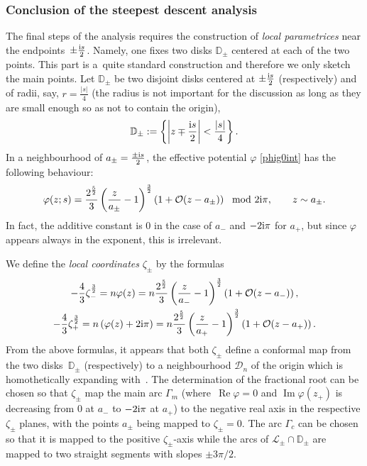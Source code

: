 \documentclass[10pt,a4paper]{amsart}
\numberwithin{equation}{section}
\theoremstyle{definition}
\def \scr{\mathscr}
\def \DD{\mathbb D}
\def\le{\left}
\def\ri{\right}
\def \Re{\operatorname{Re} }
\def \Im {\operatorname{Im} }
\begin{document}
\subsubsection{Conclusion of the steepest descent analysis}
\label{Errorg0}
%
The final steps of the analysis requires the construction of {\it local parametrices} near the endpoints~$\pm \frac {{\rm i}s}2$. Namely, one fixes two disks $\mathbb D_\pm$ centered at each of the two points. This part is a~quite standard construction and therefore we only sketch the main points.
%
Let $\DD_\pm$ be two disjoint disks centered at $\pm \frac {{\rm i}s}2$ (respectively) and of radii, say, $r=\frac{|s|}4$ (the radius is not important for the discussion as long as they are small enough so as not to contain the origin),
\[
\DD_\pm:= \left \{\le|z\mp \frac{{\rm i}s}2\ri|<\frac {|s|}4 \ri \}.
\]
In a neighbourhood of $a_\pm=\frac {\pm {\rm i}s}2$, the effective potential $\varphi$ \eqref{phig0int} has the following behaviour:
\[
\varphi(z;s) = \frac {2^\frac 52}3 \le(\frac {z}{a_\pm } -1\ri)^\frac 32\le(1 + \mathcal O(z-a_\pm)\ri) \mod 2{\rm i}\pi,\qquad z\sim a_\pm.
\]
In fact, the additive constant is $0$ in the case of $a_-$ and $-2{\rm i}\pi$ for $a_+$, but since $\varphi$ appears always in the exponent, this is irrelevant.

We define the \emph{local coordinates} $\zeta_\pm $ by the formulas
\begin{gather*}
-\frac 4 3\zeta_-^{\frac 32} = n\varphi(z) = n\frac {2^\frac 52}3 \le(\frac {z}{a_- } -1\ri)^\frac 32\le(1 + \mathcal O(z-a_-)\ri),
\\
-\frac 43\zeta_+^{\frac 32} = n\le(\varphi(z) +2{\rm i}\pi \ri)=n \frac {2^\frac 52}3 \le(\frac {z}{a_+ } -1\ri)^\frac 32\le(1 + \mathcal O(z-a_+)\ri).
\end{gather*}
From the above formulas, it appears that both $\zeta_\pm$ define a conformal map from the two disks~$\DD_\pm $ (respectively) to a neighbourhood $\scr D_n$ of the origin which is homothetically expanding with~. The determination of the fractional root can be chosen so that $\zeta_\pm$ map the main arc $\Gamma_m$ (where~${\Re \varphi=0}$ and $\Im \varphi(z_+)$ is decreasing from $0$ at $a_-$ to $-2{\rm i}\pi$ at $a_+$) to the negative real axis in the respective $\zeta_\pm$ planes, with the points $a_\pm$ being mapped to $\zeta_\pm =0$. The arc $\Gamma_c$ can be chosen so that it is mapped to the positive $\zeta_\pm$-axis while the arcs of $\scr L_\pm\cap \DD_\pm$ are mapped to two straight segments with slopes $\pm 3\pi/2$.
\end{document}
